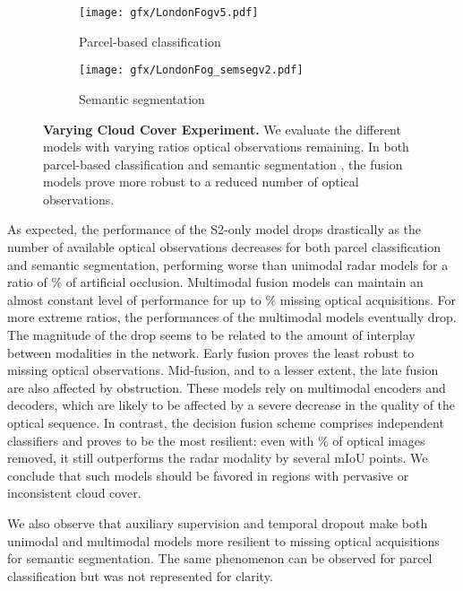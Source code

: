 \begin{figure}[h!]
    \centering
    \begin{subfigure}{\linewidth}
    \centering
    \texttt{[image: gfx/LondonFogv5.pdf]}
    \caption{Parcel-based classification}
    \label{fig:london:parcel}
    \end{subfigure}
    \vfill
    \begin{subfigure}{\linewidth}
    \centering
    \texttt{[image: gfx/LondonFog\_semsegv2.pdf]}
    \caption{Semantic segmentation}
    \label{fig:london:semantic}
    \end{subfigure}
    \caption{\textbf{Varying Cloud Cover Experiment.} We {evaluate} the different models with {varying} ratios optical observations {remaining}. In both parcel-based classification  and semantic segmentation , the fusion models prove more robust to a reduced number of optical observations.  }
    \label{fig:london}
\end{figure} 

As expected, the performance of the S2-only model drops drastically as the number of available optical observations decreases for both parcel classification and semantic segmentation, performing worse than unimodal radar models for {a ratio of} \% of artificial occlusion. 
Multimodal fusion models can maintain an almost constant level of performance for up to \% missing optical acquisitions. For more extreme ratios, the performances of the multimodal models eventually drop. The magnitude of the drop seems to be related to the amount of interplay between modalities in the network.
{Early fusion proves the least robust to missing optical observations.} Mid-fusion, and to a lesser extent, the late fusion are also affected by obstruction. These models rely on multimodal encoders and decoders, which are likely to be affected by a severe decrease in the quality of the optical sequence. In contrast, the decision fusion scheme comprises independent classifiers and proves to be the most resilient: even with \% of optical images removed, it still outperforms the radar modality by several mIoU points.
We conclude that such models should be favored in regions with pervasive or inconsistent cloud cover.

We also observe that auxiliary supervision and temporal dropout make both unimodal and multimodal models  more resilient to missing optical acquisitions for semantic segmentation. The same phenomenon can be observed for parcel classification but was not represented for clarity.

